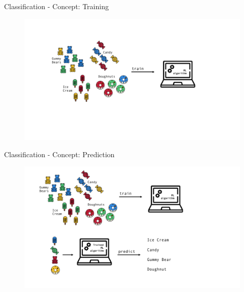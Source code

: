 \documentclass[aspectratio=169]{beamer}
\begin{document}
\begin{frame}{Classification - Concept: Training}
    \begin{figure}
        \centering
        \includegraphics[scale=0.5]{figures/example_training.pdf}
    \end{figure}
\end{frame}

\begin{frame}{Classification - Concept: Prediction}
    \begin{figure}
        \centering
        \includegraphics[scale=0.5]{figures/example_prediction.pdf}
    \end{figure}
\end{frame}
\end{document}

